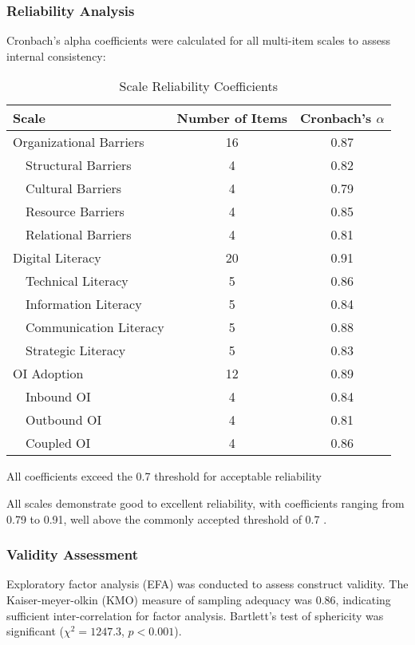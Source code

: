 \subsubsection{Reliability Analysis}
Cronbach's alpha coefficients were calculated for all multi-item scales to assess internal consistency:

\begin{table}[H]
\centering
\caption{Scale Reliability Coefficients}
\label{tab:scale_reliability}
\begin{tabular}{@{}lcc@{}}
\toprule
\textbf{Scale} & \textbf{Number of Items} & \textbf{Cronbach's $\alpha$} \\
\midrule
Organizational Barriers & 16 & 0.87 \\
\ \ Structural Barriers & 4 & 0.82 \\
\ \ Cultural Barriers & 4 & 0.79 \\
\ \ Resource Barriers & 4 & 0.85 \\
\ \ Relational Barriers & 4 & 0.81 \\
\midrule
Digital Literacy & 20 & 0.91 \\
\ \ Technical Literacy & 5 & 0.86 \\
\ \ Information Literacy & 5 & 0.84 \\
\ \ Communication Literacy & 5 & 0.88 \\
\ \ Strategic Literacy & 5 & 0.83 \\
\midrule
OI Adoption & 12 & 0.89 \\
\ \ Inbound OI & 4 & 0.84 \\
\ \ Outbound OI & 4 & 0.81 \\
\ \ Coupled OI & 4 & 0.86 \\
\bottomrule
\end{tabular}
\begin{tablenotes}
\item All coefficients exceed the 0.7 threshold for acceptable reliability \citep{nunnally1978psychometric}
\end{tablenotes}
\end{table}

All scales demonstrate good to excellent reliability, with coefficients ranging from 0.79 to 0.91, well above the commonly accepted threshold of 0.7 \citep{nunnally1978psychometric}.

\subsubsection{Validity Assessment}
Exploratory factor analysis (EFA) was conducted to assess construct validity. The Kaiser-meyer-olkin (KMO) measure of sampling adequacy was 0.86, indicating sufficient inter-correlation for factor analysis. Bartlett's test of sphericity was significant ($\chi^2 = 1247.3$, $p < 0.001$).

